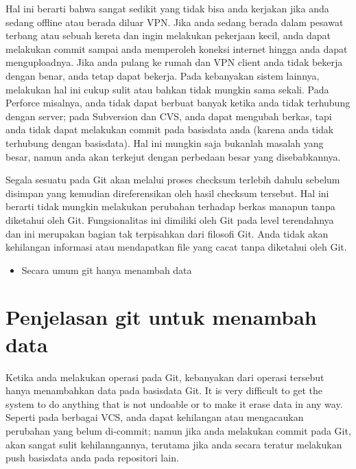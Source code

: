 {\vspace{\baselineskip}
\noindent 
{\fontsize{14pt}{14pt}\selectfont Hal ini berarti bahwa sangat sedikit yang tidak bisa anda kerjakan jika anda sedang offline atau berada diluar VPN. Jika anda sedang berada dalam pesawat terbang atau sebuah kereta dan ingin melakukan pekerjaan kecil, anda dapat melakukan commit sampai anda memperoleh koneksi internet hingga anda dapat menguploadnya. Jika anda pulang ke rumah dan VPN client anda tidak bekerja dengan benar, anda tetap dapat bekerja. Pada kebanyakan sistem lainnya, melakukan hal ini cukup sulit atau bahkan tidak mungkin sama sekali. Pada Perforce misalnya, anda tidak dapat berbuat banyak ketika anda tidak terhubung dengan server; pada Subversion dan CVS, anda dapat mengubah berkas, tapi anda tidak dapat melakukan commit pada basisdata anda (karena anda tidak terhubung dengan basisdata). Hal ini mungkin saja bukanlah masalah yang besar, namun anda akan terkejut dengan perbedaan besar yang disebabkannya. \\} \par

\vspace{\baselineskip}

\noindent 
{\fontsize{14pt}{14pt}\selectfont Segala sesuatu pada Git akan melalui proses checksum terlebih dahulu sebelum disimpan yang kemudian direferensikan oleh hasil checksum tersebut. Hal ini berarti tidak mungkin melakukan perubahan terhadap berkas manapun tanpa diketahui oleh Git. Fungsionalitas ini dimiliki oleh Git pada level terendahnya dan ini merupakan bagian tak terpisahkan dari filosofi Git. Anda tidak akan kehilangan informasi atau mendapatkan file yang cacat tanpa diketahui oleh Git. \\} \par

\vspace{\baselineskip}
\begin{itemize}
	\item Secara umum git hanya menambah data
\end{itemize}

\vspace{\baselineskip}
\noindent 
{\fontsize{14pt}{14pt}\section{Penjelasan git untuk menambah data}
	
	\vspace{\baselineskip}
\noindent 
{\fontsize{14pt}{14pt}\selectfont Ketika anda melakukan operasi pada Git, kebanyakan dari operasi tersebut hanya menambahkan data pada basisdata Git. It is very difficult to get the system to do anything that is not undoable or to make it erase data in any way. Seperti pada berbagai VCS, anda dapat kehilangan atau mengacaukan perubahan yang belum di-commit; namun jika anda melakukan commit pada Git, akan sangat sulit kehilanngannya, terutama jika anda secara teratur melakukan push basisdata anda pada repositori lain. \\} \par

}}
